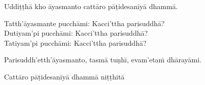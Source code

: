 \medskip

\begin{center}
Uddiṭṭhā kho āyasmanto cattāro pāṭidesanīyā dhammā.

\smallskip

Tatth'āyasmante pucchāmi: Kacci'ttha parisuddhā?\\
Dutiyam'pi pucchāmi: Kacci'ttha parisuddhā?\\
Tatiyam'pi pucchāmi: Kacci'ttha parisuddhā?

\smallskip

Parisuddh'etth'āyasmanto, tasmā tuṇhī, evam'etaṁ dhārayāmi.
\end{center}

\begin{outro}
  Cattāro pāṭidesanīyā dhammā niṭṭhitā
\end{outro}

\clearpage
